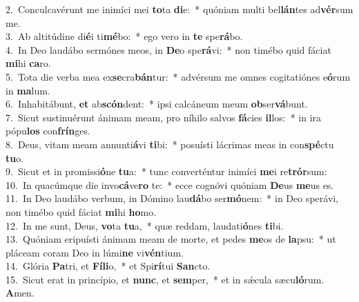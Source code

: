 {2.~}Conculcavérunt me inimíci mei \textbf{to}ta \textbf{di}e:~* quóniam multi bel\textbf{lán}tes ad\textbf{vér}sum me.\\
{3.~}Ab altitúdine di\textbf{é}i ti\textbf{mé}bo:~* ego vero in \textbf{te} spe\textbf{rá}bo.\\
{4.~}In Deo laudábo sermónes meos, in \textbf{De}o spe\textbf{rá}vi:~* non timébo quid fáciat \textbf{mi}hi \textbf{ca}ro.\\
{5.~}Tota die verba mea ex\textbf{se}cra\textbf{bán}tur:~* advérsum me omnes cogitatiónes e\textbf{ó}rum in \textbf{ma}lum.\\
{6.~}Inhabitábunt, \textbf{et} ab\textbf{scón}dent:~* ipsi calcáneum meum \textbf{ob}ser\textbf{vá}bunt.\\
{7.~}Sicut sustinuérunt ánimam meam, pro níhilo salvos \textbf{fá}cies \textbf{il}los:~* in ira pópu\textbf{los} con\textbf{frín}ges.\\
{8.~}Deus, vitam meam annunti\textbf{á}vi \textbf{ti}bi:~* posuísti lácrimas meas in con\textbf{spé}ctu \textbf{tu}o.\\
{9.~}Sicut et in promissi\textbf{ó}ne \textbf{tu}a:~* tunc converténtur inimíci \textbf{me}i re\textbf{trór}sum:\\
{10.~}In quacúmque die invo\textbf{cá}ve\textbf{ro} te:~* ecce cognóvi quóniam \textbf{De}us \textbf{me}us es.\\
{11.~}In Deo laudábo verbum, in Dómino lau\textbf{dá}bo ser\textbf{mó}nem:~* in Deo sperávi, non timébo quid fáciat \textbf{mi}hi \textbf{ho}mo.\\
{12.~}In me sunt, Deus, \textbf{vo}ta \textbf{tu}a,~* quæ reddam, laudati\textbf{ó}nes \textbf{ti}bi.\\
{13.~}Quóniam eripuísti ánimam meam de morte, et pedes \textbf{me}os de \textbf{la}psu:~* ut pláceam coram Deo in lúmi\textbf{ne} vi\textbf{vén}tium.\\
{14.~}Glória \textbf{Pa}tri, et \textbf{Fí}\textbf{li}o,~* et Spi\textbf{rí}tui \textbf{San}cto.\\
{15.~}Sicut erat in princípio, et \textbf{nunc}, et \textbf{sem}per,~* et in sǽcula sæcu\textbf{ló}rum. \textbf{A}men.\\
